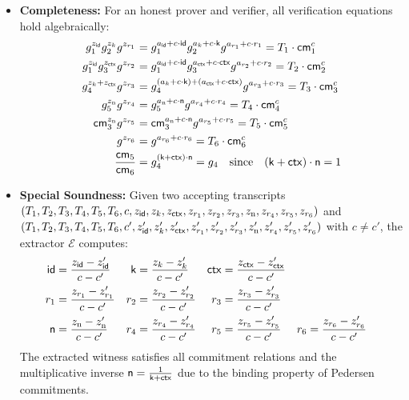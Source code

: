 \begin{itemize}
    \item \textbf{Completeness:} For an honest prover and verifier, all verification equations hold algebraically:
\begin{align*}
        g_1^{z_{\mathsf{id}}} g_2^{z_k} g^{z_{r_1}} &= g_1^{a_{\mathsf{id}} + c \cdot \mathsf{id}} g_2^{a_k + c \cdot \mathsf{k}} g^{a_{r_1} + c \cdot r_1} = T_1 \cdot \mathsf{cm}_1^c \\
        g_1^{z_{\mathsf{id}}} g_3^{z_{\mathsf{ctx}}} g^{z_{r_2}} &= g_1^{a_{\mathsf{id}} + c \cdot \mathsf{id}} g_3^{a_{\mathsf{ctx}} + c \cdot \mathsf{ctx}} g^{a_{r_2} + c \cdot r_2} = T_2 \cdot \mathsf{cm}_2^c \\
        g_4^{z_k + z_{\mathsf{ctx}}} g^{z_{r_3}} &= g_4^{(a_k + c \cdot \mathsf{k}) + (a_{\mathsf{ctx}} + c \cdot \mathsf{ctx})} g^{a_{r_3} + c \cdot r_3} = T_3 \cdot \mathsf{cm}_3^c \\
        g_5^{z_{\text{n}}} g^{z_{r_4}} &= g_5^{a_{\text{n}} + c \cdot \textsf{n}} g^{a_{r_4} + c \cdot r_4} = T_4 \cdot \mathsf{cm}_4^c \\
        \mathsf{cm}_3^{z_{\text{n}}} g^{z_{r_5}} &= \mathsf{cm}_3^{a_{\text{n}} + c \cdot \textsf{n}} g^{a_{r_5} + c \cdot r_5} = T_5 \cdot \mathsf{cm}_5^c \\
        g^{z_{r_6}} &= g^{a_{r_6} + c \cdot r_6} = T_6 \cdot \mathsf{cm}_6^c \\
        \frac{\mathsf{cm}_5}{\mathsf{cm}_6} &= g_4^{(\mathsf{k} + \mathsf{ctx}) \cdot \textsf{n}} = g_4 \quad \text{since} \quad (\mathsf{k} + \mathsf{ctx}) \cdot \textsf{n} = 1
    \end{align*}
    
    \item \textbf{Special Soundness:} Given two accepting transcripts $(T_1, T_2, T_3, T_4, T_5, T_6, c, z_{\mathsf{id}}, z_k, z_{\mathsf{ctx}}, z_{r_1}, z_{r_2}, z_{r_3}, z_{\text{n}}, z_{r_4}, z_{r_5}, z_{r_6})$ and $(T_1, T_2, T_3, T_4, T_5, T_6, c', z_{\mathsf{id}}', z_k', z_{\mathsf{ctx}}', z_{r_1}', z_{r_2}', z_{r_3}', z_{\text{n}}', z_{r_4}', z_{r_5}', z_{r_6}')$ with $c \neq c'$, the extractor $\mathcal{E}$ computes:
    \begin{align*}
        \mathsf{id} &= \frac{z_{\mathsf{id}} - z_{\mathsf{id}}'}{c - c'} & \mathsf{k} &= \frac{z_k - z_k'}{c - c'} & \mathsf{ctx} &= \frac{z_{\mathsf{ctx}} - z_{\mathsf{ctx}}'}{c - c'} \\
        r_1 &= \frac{z_{r_1} - z_{r_1}'}{c - c'} & r_2 &= \frac{z_{r_2} - z_{r_2}'}{c - c'} & r_3 &= \frac{z_{r_3} - z_{r_3}'}{c - c'} \\
        \textsf{n} &= \frac{z_{\text{n}} - z_{\text{n}}'}{c - c'} & r_4 &= \frac{z_{r_4} - z_{r_4}'}{c - c'} & r_5 &= \frac{z_{r_5} - z_{r_5}'}{c - c'} & r_6 &= \frac{z_{r_6} - z_{r_6}'}{c - c'}
    \end{align*}
    The extracted witness satisfies all commitment relations and the multiplicative inverse $\textsf{n} = \frac{1}{\mathsf{k} + \mathsf{ctx}}$ due to the binding property of Pedersen commitments.
    

\end{itemize}
